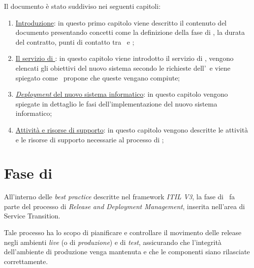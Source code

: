 		Il documento è stato suddiviso nei seguenti capitoli:
		\begin{enumerate}[noitemsep]
			
			\item \hyperref[ch:introduzione]{Introduzione}: in questo primo capitolo viene descritto il contenuto del documento presentando concetti come la definizione della fase di \rollout, la durata del contratto, punti di contatto tra \azienda~e \istituto;
			
			\item \hyperref[ch:servizio_helpdesk]{Il servizio di \helpdesk}: in questo capitolo viene introdotto il servizio di \helpdesk, vengono elencati gli obiettivi del nuovo sistema secondo le richieste dell'\istituto~e viene spiegato come \azienda~propone che queste vengano compiute;
			
			\item \hyperref[ch:implementazione]{\textit{Deployment} del nuovo sistema informatico}: in questo capitolo vengono spiegate in dettaglio le fasi dell'implementazione del nuovo sistema informatico;
			
			\item \hyperref[ch:supporto]{Attività e risorse di supporto}: in questo capitolo vengono descritte le attività e le risorse di supporto necessarie al processo di \rollout;
			
			
			
		\end{enumerate}
	
\section{Fase di \rollout}

	All'interno delle \textit{best practice} descritte nel framework \textit{ITIL V3}\cite{itil_website}, la fase di \rollout~fa parte del processo di \textit{Release and Deployment Management}, inserita nell'area di Service Transition.
	
	Tale processo ha lo scopo di pianificare e controllare il movimento delle release negli ambienti \textit{live} (o di \textit{produzione}) e di \textit{test}, assicurando che l'integrità dell'ambiente di produzione venga mantenuta e che le componenti siano rilasciate correttamente.
	
